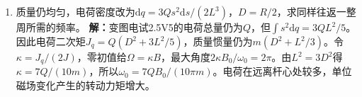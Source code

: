 \documentclass[UTF8,fontset=fandol,a4paper,11pt]{ctexart}
\begin{document}
\begin{enumerate}
\item 质量仍均匀，电荷密度改为$\mathrm dq=3Qs^2\mathrm ds/(2L^3)$，$D=R/2$，求同样往返一整周所需的频率。
\textbf{解：}变图电试2.5V5的电荷总量仍为$Q$，但$\int s^2\mathrm dq=3QL^2/5$。因此电荷二次矩$J_q=Q(D^2+3L^2/5)$，质量惯量仍为$m(D^2+L^2/3)$。令$\kappa=J_q/(2J)$，零初值给$\Omega=\kappa B$，最大角度$2\kappa B_0/\omega_0=2\pi$。由$L^2=3D^2$得$\kappa=7Q/(10m)$，所以$\omega_0=7QB_0/(10\pi m)$。电荷在远离杆心处较多，单位磁场变化产生的转动力矩增大。
\begin{center}\begin{minipage}{.98\linewidth}\centering
{}
\end{minipage}
\end{center}
\end{enumerate}
\end{document}
